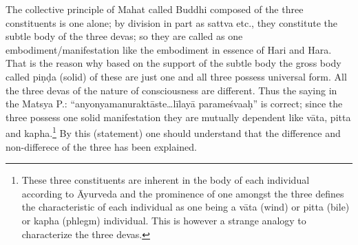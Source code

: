 The collective principle of Mahat called Buddhi composed of the three constituents is one alone; by division in part as sattva etc., they constitute the subtle body of the three devas; so they are called as one embodiment/manifestation like the embodiment in essence of Hari and Hara. That is the reason why based on the support of the subtle body the gross body called piṇḍa (solid) of these are just one and all three possess universal form. All the three devas of the nature of consciousness are different. Thus the saying in the Matsya P.: “anyonyamanuraktāste…līlayā parameśvaaḥ” is correct; since the three possess one solid manifestation they are mutually dependent like vāta, pitta and kapha.\footnote{These three constituents are inherent in the body of each individual according to Āyurveda and the prominence of one amongst the three defines the characteristic of each individual as one being a vāta (wind) or pitta (bile) or kapha (phlegm) individual. This is however a strange analogy to characterize the three devas.} By this (statement) one should understand that the difference and non-differece of the three has been explained.


